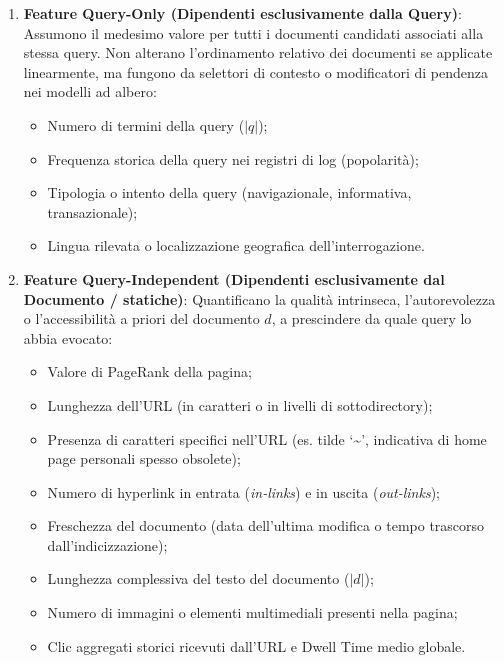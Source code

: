 \begin{enumerate}
    \item \textbf{Feature Query-Only (Dipendenti esclusivamente dalla Query)}:
    Assumono il medesimo valore per tutti i documenti candidati associati alla stessa query. Non alterano l'ordinamento relativo dei documenti se applicate linearmente, ma fungono da selettori di contesto o modificatori di pendenza nei modelli ad albero:
    \begin{itemize}
        \item Numero di termini della query ($|q|$);
        \item Frequenza storica della query nei registri di log (popolarit\`a);
        \item Tipologia o intento della query (navigazionale, informativa, transazionale);
        \item Lingua rilevata o localizzazione geografica dell'interrogazione.
    \end{itemize}

    \item \textbf{Feature Query-Independent (Dipendenti esclusivamente dal Documento / statiche)}:
    Quantificano la qualit\`a intrinseca, l'autorevolezza o l'accessibilit\`a a priori del documento $d$, a prescindere da quale query lo abbia evocato:
    \begin{itemize}
        \item Valore di PageRank della pagina;
        \item Lunghezza dell'URL (in caratteri o in livelli di sottodirectory);
        \item Presenza di caratteri specifici nell'URL (es. tilde `\textasciitilde{}', indicativa di home page personali spesso obsolete);
        \item Numero di hyperlink in entrata (\textit{in-links}) e in uscita (\textit{out-links});
        \item Freschezza del documento (data dell'ultima modifica o tempo trascorso dall'indicizzazione);
        \item Lunghezza complessiva del testo del documento ($|d|$);
        \item Numero di immagini o elementi multimediali presenti nella pagina;
        \item Clic aggregati storici ricevuti dall'URL e Dwell Time medio globale.
    \end{itemize}


\end{enumerate}
